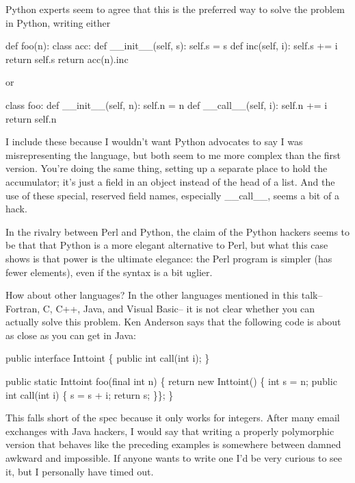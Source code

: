Python experts seem to
                  agree that this is the preferred way to solve the problem in
                  Python, writing either
                  
                    
def foo(n):
  class acc:
    def \_\_init\_\_(self, s):
        self.s = s
    def inc(self, i):
        self.s += i
        return self.s
  return acc(n).inc

                  
                  or
                  
                    
class foo:
  def \_\_init\_\_(self, n):
      self.n = n
  def \_\_call\_\_(self, i):
      self.n += i
      return self.n

                  
                  I include these because I wouldn't want Python advocates to
                  say I was misrepresenting the language, but both seem to me
                  more complex than the first version. You're doing the same
                  thing, setting up a separate place to hold the accumulator;
                  it's just a field in an object instead of the head of a list.
                  And the use of these special, reserved field names, especially
                  \_\_call\_\_, seems a bit of a hack.

In the
                  rivalry between Perl and Python, the claim of the Python
                  hackers seems to be that that Python is a more elegant
                  alternative to Perl, but what this case shows is that power is
                  the ultimate elegance: the Perl program is simpler (has fewer
                  elements), even if the syntax is a bit uglier.

How
                  about other languages? In the other languages mentioned in
                  this talk-- Fortran, C, C++, Java, and Visual Basic-- it is
                  not clear whether you can actually solve this problem. Ken
                  Anderson says that the following code is about as close as you
                  can get in Java:
                  
                    
public interface Inttoint \{
  public int call(int i);
\}

                  
                  
                    
public static Inttoint foo(final int n) \{
  return new Inttoint() \{
    int s = n;
    public int call(int i) \{
    s = s + i;
    return s;
    \}\};
\}

                  
                  This falls short of the spec because it only works for
                  integers. After many email exchanges with Java hackers, I
                  would say that writing a properly polymorphic version that
                  behaves like the preceding examples is somewhere between
                  damned awkward and impossible. If anyone wants to write one
                  I'd be very curious to see it, but I personally have timed
                  out.

